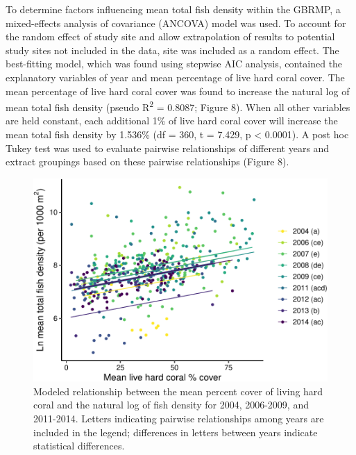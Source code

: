 \documentclass[12pt,]{article}
\begin{document}
To determine factors influencing mean total fish density within the
GBRMP, a mixed-effects analysis of covariance (ANCOVA) model was used.
To account for the random effect of study site and allow extrapolation
of results to potential study sites not included in the data, site was
included as a random effect. The best-fitting model, which was found
using stepwise AIC analysis, contained the explanatory variables of year
and mean percentage of live hard coral cover. The mean percentage of
live hard coral cover was found to increase the natural log of mean
total fish density (pseudo R\textsuperscript{2} = 0.8087; Figure 8).
When all other variables are held constant, each additional 1\% of live
hard coral cover will increase the mean total fish density by 1.536\%
(df = 360, t = 7.429, p \textless{} 0.0001). A post hoc Tukey test was
used to evaluate pairwise relationships of different years and extract
groupings based on these pairwise relationships (Figure 8).

\begin{figure}

{\centering \includegraphics{Mullaney_ENV872_Project_files/figure-latex/Fish Density Plot-1} 

}

\caption{Modeled relationship between the mean percent cover of living hard coral and the natural log of fish density for 2004, 2006-2009, and 2011-2014. Letters indicating pairwise relationships among years are included in the legend; differences in letters between years indicate statistical differences.}\label{fig:Fish Density Plot}
\end{figure}
\end{document}
